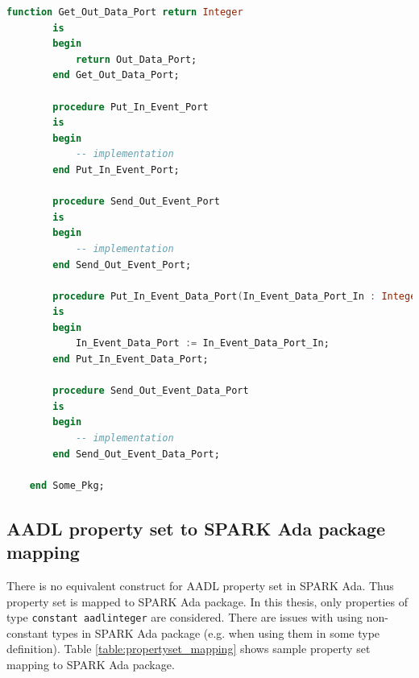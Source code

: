 \begin{lstlisting}[language=ada, frame=single, gobble=0, caption={Translation of sample AADL package from listing \ref{lst:aadl_sample}}, label={lst:package_mapping}]
	    function Get_Out_Data_Port return Integer
	    is
	    begin
	        return Out_Data_Port;
	    end Get_Out_Data_Port;

	    procedure Put_In_Event_Port
	    is
	    begin
	        -- implementation
	    end Put_In_Event_Port;

	    procedure Send_Out_Event_Port
	    is
	    begin
	        -- implementation
	    end Send_Out_Event_Port;

	    procedure Put_In_Event_Data_Port(In_Event_Data_Port_In : Integer)
	    is
	    begin
	        In_Event_Data_Port := In_Event_Data_Port_In;
	    end Put_In_Event_Data_Port;

	    procedure Send_Out_Event_Data_Port
	    is
	    begin
	        -- implementation
	    end Send_Out_Event_Data_Port;

	end Some_Pkg;
\end{lstlisting}
\doublespacing



\subsection{AADL property set to SPARK Ada package mapping}
\label{codegen:mapping:propertyset}

There is no equivalent construct for AADL property set in SPARK Ada. Thus property set is mapped to SPARK Ada package. In this thesis, only properties of type \lstinline{constant aadlinteger} are considered. There are issues with using non-constant types in SPARK Ada package (e.g. when using them in some type definition). Table \ref{table:propertyset_mapping} shows sample property set mapping to SPARK Ada package.

